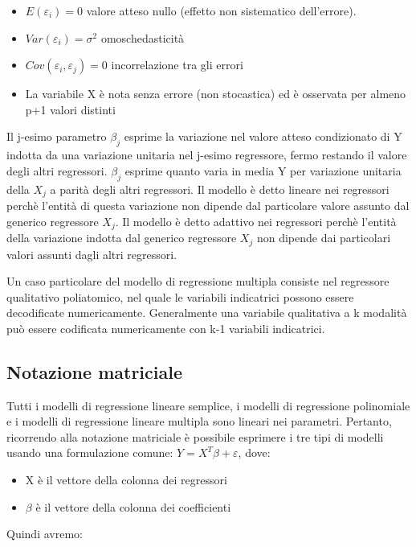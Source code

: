 \documentclass[a4paper]{extarticle}
\begin{document}
\begin{itemize}
\item $E( \varepsilon_i)=0$ valore atteso nullo (effetto non sistematico dell'errore).
\item $Var(\varepsilon_i) = \sigma^2$ omoschedasticità
\item  $Cov(\varepsilon_i,\varepsilon_j) = 0$ incorrelazione tra gli errori
\item La variabile X è nota senza errore (non stocastica) ed è osservata per almeno p+1 valori distinti
\end{itemize}

Il j-esimo parametro $\beta_j$ esprime la variazione nel valore atteso condizionato di Y indotta da una variazione unitaria nel j-esimo regressore, fermo restando il valore degli altri regressori. $\beta_j$ esprime quanto varia in media Y per variazione unitaria della $X_j$ a parità degli altri regressori. Il modello è detto lineare nei regressori perchè l'entità di questa variazione non dipende dal particolare valore assunto dal generico regressore $X_j$. Il modello è detto adattivo nei regressori perchè l'entità della variazione indotta dal generico regressore $X_j$ non dipende dai particolari valori assunti dagli altri regressori.

Un caso particolare del modello di regressione multipla consiste nel regressore qualitativo poliatomico, nel quale le variabili indicatrici possono essere decodificate numericamente. Generalmente una variabile qualitativa a k modalità può essere codificata numericamente con k-1 variabili indicatrici.

\subsection{Notazione matriciale}

Tutti i modelli di regressione lineare semplice, i modelli di regressione polinomiale e i modelli di regressione lineare multipla sono lineari nei parametri. Pertanto, ricorrendo alla notazione matriciale è possibile esprimere i tre tipi di modelli usando una formulazione comune: $Y = X^T \beta + \varepsilon$, dove:

\begin{itemize}
\item X è il vettore della colonna dei regressori
\item $\beta$ è il vettore della colonna dei coefficienti
\end{itemize}

Quindi avremo:
\end{document}
